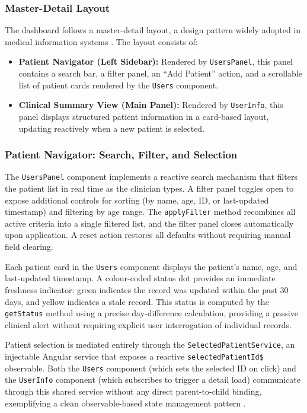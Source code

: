 \subsubsection{Master-Detail Layout}

The dashboard follows a master-detail layout, a design pattern widely adopted
in medical information systems \cite{patientSafetyDashboards2021}. The layout
consists of:

\begin{itemize}
    \item \textbf{Patient Navigator (Left Sidebar):} Rendered by
          \texttt{UsersPanel}, this panel contains a search bar, a filter
          panel, an ``Add Patient'' action, and a scrollable list of patient
          cards rendered by the \texttt{Users} component.
    \item \textbf{Clinical Summary View (Main Panel):} Rendered by
          \texttt{UserInfo}, this panel displays structured patient information
          in a card-based layout, updating reactively when a new patient is
          selected.
\end{itemize}

\subsubsection{Patient Navigator: Search, Filter, and Selection}

The \texttt{UsersPanel} component implements a reactive search mechanism that
filters the patient list in real time as the clinician types. A filter panel
toggles open to expose additional controls for sorting (by name, age, ID, or
last-updated timestamp) and filtering by age range. The \texttt{applyFilter}
method recombines all active criteria into a single filtered list, and the
filter panel closes automatically upon application. A reset action restores
all defaults without requiring manual field clearing.

Each patient card in the \texttt{Users} component displays the patient's name,
age, and last-updated timestamp. A colour-coded status dot provides an
immediate freshness indicator: green indicates the record was updated within
the past 30 days, and yellow indicates a stale record. This status is computed
by the \texttt{getStatus} method using a precise day-difference calculation,
providing a passive clinical alert without requiring explicit user interrogation
of individual records.

Patient selection is mediated entirely through the \texttt{SelectedPatientService},
an injectable Angular service that exposes a reactive \texttt{selectedPatientId\$}
observable. Both the \texttt{Users} component (which sets the selected ID on
click) and the \texttt{UserInfo} component (which subscribes to trigger a detail
load) communicate through this shared service without any direct parent-to-child
binding, exemplifying a clean observable-based state management pattern
\cite{angularDocs}.

